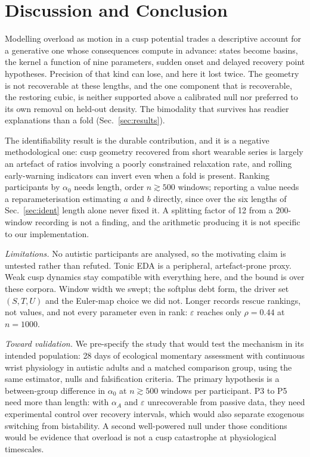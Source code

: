 \documentclass[conference]{IEEEtran}
\begin{document}
\section{Discussion and Conclusion}

Modelling overload as motion in a cusp potential trades a descriptive account
for a generative one whose consequences compute in advance: states become
basins, the kernel a function of nine parameters, sudden onset and delayed
recovery point hypotheses. Precision of that kind can lose, and here it lost twice. The geometry is not
recoverable at these lengths, and the one component that is recoverable, the
restoring cubic, is neither supported above a calibrated null nor preferred to
its own removal on held-out density. The bimodality that survives has readier
explanations than a fold (Sec.~\ref{sec:results}).

The identifiability result is the durable contribution, and it is a negative
methodological one: cusp geometry recovered from short wearable series is
largely an artefact of ratios involving a poorly constrained relaxation rate,
and rolling early-warning indicators can invert even when a fold is present.
Ranking participants by $\alpha_0$ needs length, order
$n\gtrsim500$ windows; reporting a value needs a reparameterisation estimating
$a$ and $b$ directly, since over the six lengths of Sec.~\ref{sec:ident} length
alone never fixed it. A splitting factor of 12 from a 200-window recording is
not a finding, and the arithmetic producing it is not specific to our
implementation.

\emph{Limitations.} No autistic participants are analysed, so the motivating claim
is untested rather than refuted. Tonic EDA is a peripheral, artefact-prone
proxy. Weak cusp dynamics stay compatible with everything here, and the bound
is over these corpora. Window width we swept; the softplus debt form, the
driver set $(S,T,U)$ and the Euler-map choice we did not. Longer records rescue
rankings, not values, and not every parameter even in rank: $\varepsilon$
reaches only $\rho=0.44$ at $n=1000$.

\emph{Toward validation.} We pre-specify the study that would test the mechanism in its intended
population: 28 days of ecological momentary assessment with continuous wrist
physiology in autistic adults and a matched comparison group, using the same
estimator, nulls and falsification criteria. The primary hypothesis is a
between-group difference in $\alpha_0$ at $n\gtrsim500$ windows per
participant. P3 to P5 need more than length: with $\alpha_A$ and $\varepsilon$
unrecoverable from passive data, they need experimental control over recovery
intervals, which would also separate exogenous switching from bistability. A
second well-powered null under those conditions would be evidence that overload
is not a cusp catastrophe at physiological timescales.
\end{document}
